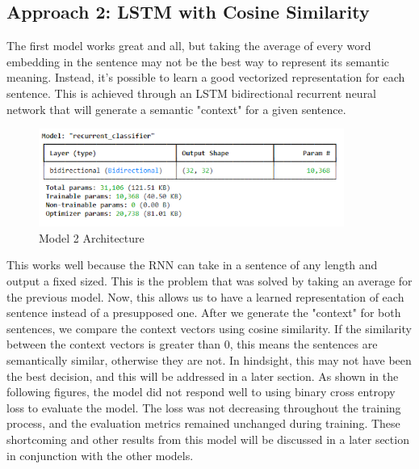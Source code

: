 \documentclass{article}
\begin{document}
\subsection{Approach 2: LSTM with Cosine Similarity}
The first model works great and all, but taking the average of every word embedding in the sentence may not be the best way to represent its semantic meaning. Instead, it's possible to learn a good vectorized representation for each sentence. This is achieved through an LSTM bidirectional recurrent neural network that will generate a semantic "context" for a given sentence.
\begin{figure}[htp]
    \centering
    \includegraphics[width=10cm]{model2.png}
    \caption{Model 2 Architecture}
\end{figure}
This works well because the RNN can take in a sentence of any length and output a fixed sized. This is the problem that was solved by taking an average for the previous model. Now, this allows us to have a learned representation of each sentence instead of a presupposed one. After we generate the "context" for both sentences, we compare the context vectors using cosine similarity. If the similarity between the context vectors is greater than 0, this means the sentences are semantically similar, otherwise they are not. In hindsight, this may not have been the best decision, and this will be addressed in a later section. As shown in the following figures, the model did not respond well to using binary cross entropy loss to evaluate the model. The loss was not decreasing throughout the training process, and the evaluation metrics remained unchanged during training. These shortcoming and other results from this model will be discussed in a later section in conjunction with the other models.
\end{document}
